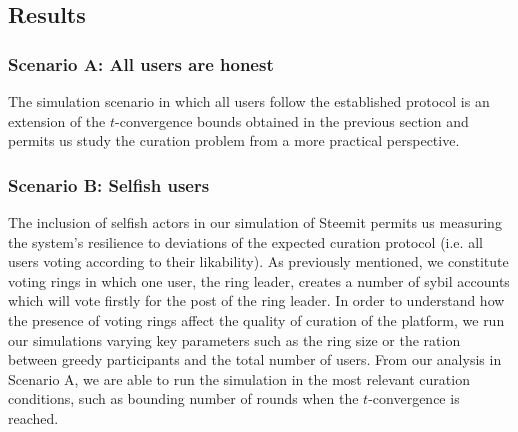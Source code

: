   \subsection{Results}

    \subsubsection*{Scenario A: All users are honest}
      The simulation scenario in which all users follow the established protocol
      is an extension of the $t$-convergence bounds obtained in the previous
      section and permits us study the curation problem from a more practical
      perspective.

    \subsubsection{Scenario B: Selfish users}
      The inclusion of selfish actors in our simulation of Steemit permits us
      measuring the system's resilience to deviations of the expected curation
      protocol (i.e. all users voting according to their likability). As
      previously mentioned, we constitute voting rings in which one user, the
      ring leader, creates a number of sybil accounts which will vote firstly
      for the post of the ring leader. In order to understand how the presence
      of voting rings affect the quality of curation of the platform, we run our
      simulations varying key parameters such as the ring size or the ration
      between greedy participants and the total number of users. From our
      analysis in Scenario A, we are able to run the simulation in the most
      relevant curation conditions, such as bounding number of rounds when the
      $t$-convergence is reached.
